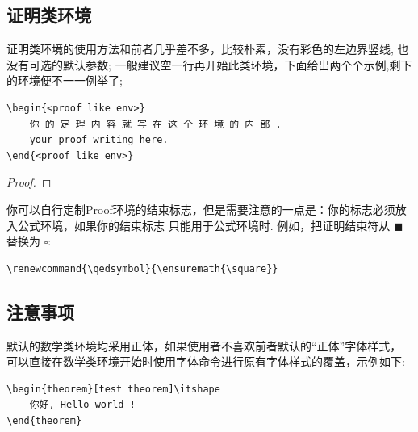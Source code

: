 \ExplSyntaxOn
{}
\ExplSyntaxOff

\subsection{证明类环境}
证明类环境的使用方法和前者几乎差不多，比较朴素，没有彩色的左边界竖线, 也没有可选的默认参数; 
一般建议空一行再开始此类环境，下面给出两个个示例,剩下的环境便不一一例举了;

\begin{verbatim}
\begin{<proof like env>}
    你 的 定 理 内 容 就 写 在 这 个 环 境 的 内 部 .
    your proof writing here.
\end{<proof like env>}
\end{verbatim}

\vspace*{4em}
\begin{proof}
    \boomen \par 
    \boomcn
\end{proof}

\begin{example}
    \boomen \par 
    \boomcn
\end{example}

你可以自行定制Proof环境的结束标志，但是需要注意的一点是：你的标志必须放入公式环境，如果你的结束标志
只能用于公式环境时. 例如，把证明结束符从 \(\blacksquare\) 替换为 $\square$:
\begin{verbatim}
\renewcommand{\qedsymbol}{\ensuremath{\square}}
\end{verbatim}


\subsection{注意事项}
默认的数学类环境均采用正体\cmd{\upshape}，如果使用者不喜欢前者默认的``正体''字体样式，
可以直接在数学类环境开始时使用字体命令\cmd{\itshape}进行原有字体样式的覆盖，示例如下:

\begin{verbatim}
\begin{theorem}[test theorem]\itshape
    你好, Hello world !
\end{theorem}
\end{verbatim}

